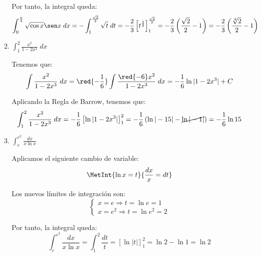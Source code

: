 \begin{ejercicio}
\begin{enumerate}
        Por tanto, la integral queda:
        \begin{equation*}
            \int_0^\frac{\pi}{4} \sqrt{\cos x}\sen x\;dx
            = -\int_1^{\frac{\sqrt{2}}{2}} \sqrt{t}\;dt
            = -\frac{2}{3}\left[t^{\frac{3}{2}}\right]_1^{\frac{\sqrt{2}}{2}}
            = -\frac{2}{3}\left(\frac{\sqrt{2}}{2}-1\right)
            = -\frac{2}{3}\left(\frac{\sqrt[4]{2}}{2}-1\right)
        \end{equation*}

        \item $\displaystyle \int_1^2 \frac{x^2}{1-2x^3}\;dx$
        
        Tenemos que:
        \begin{equation*}
            \int \frac{x^2}{1-2x^3}\;dx = \red{-\frac{1}{6}}
            \int \frac{\red{-6}x^2}{1-2x^3}\;dx
            = -\frac{1}{6}\ln |1-2x^3|+C
        \end{equation*}

        Aplicando la Regla de Barrow, tenemos que:
        \begin{equation*}
            \int_1^2 \frac{x^2}{1-2x^3}\;dx
            = -\frac{1}{6}\left[\ln |1-2x^3|\right]_1^2
            = -\frac{1}{6}\left(\ln |-15|-\cancel{\ln |-1|}\right)
            = -\frac{1}{6}\ln 15
        \end{equation*}

        \item $\displaystyle \int_e^{e^2} \frac{dx}{x\ln x}$
        
        Aplicamos el siguiente cambio de variable:
        \begin{equation*}
            \MetInt{\ln x =t}{\frac{dx}{x}=dt}
        \end{equation*}

        Los nuevos límites de integración son:
        \begin{equation*}
            \left\{\begin{array}{l}
                x=e \Longrightarrow t=\ln e =1 \\
                x=e^2 \Longrightarrow t=\ln e^2 =2
            \end{array}\right.
        \end{equation*}

        Por tanto, la integral queda:
        \begin{equation*}
            \int_e^{e^2} \frac{dx}{x\ln x}
            = \int_1^2 \frac{dt}{t}
            = \left[\ln |t|\right]_1^2
            = \ln 2 - \ln 1 = \ln 2
        \end{equation*}


\end{enumerate}
\end{ejercicio}
